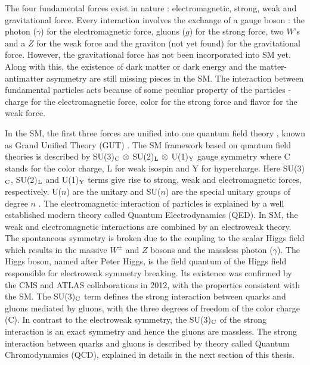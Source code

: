 The four fundamental forces exist in nature : electromagnetic, strong, weak and gravitational force. Every interaction involves the exchange of a gauge boson : the photon ($\gamma$) for the electromagnetic force, gluons ($g$) for the strong force, two $W$'s and a $Z$ for the weak force and the graviton (not yet found) for the gravitational force. However, the gravitational force has not been incorporated into SM yet. Along with this, the existence of dark matter or dark energy and the matter-antimatter asymmetry are still missing pieces in the SM. The interaction between fundamental particles acts because of some peculiar property of the particles - charge for the electromagnetic force, color for the strong force and flavor for the weak force. 

In the SM, the first three forces are unified into one quantum field theory \cite{Peskin:1995ev}, known as Grand Unified Theory (GUT) \cite{Glashow:1979pj,Salam:1980jd,Georgi:1974sy}. The SM framework based on quantum field theories is described by SU(3)$_{\rm C}~\otimes$ SU(2)$_{\rm L}~\otimes$ U(1)$_{\rm Y}$ gauge symmetry where C stands for the color charge, L for weak isospin and Y for hypercharge. Here SU(3)$_{\rm C}$, SU(2)$_{\rm L}$ and U(1)$_{\rm Y}$ terms give rise to strong, weak and electromagnetic forces, respectively. U($n$) are the unitary and SU($n$) are the special unitary groups of degree $n$ . The electromagnetic interaction of particles is explained by a well established modern theory called Quantum Electrodynamics (QED). In SM, the weak and electromagnetic interactions are combined by an electroweak theory. The spontaneous symmetry is broken due to the coupling to the scalar Higgs field which results in the massive $W^{\pm}$ and $Z$ bosons and the massless photon ($\gamma$). The Higgs boson, named after Peter Higgs, is the field quantum of the Higgs field responsible for electroweak symmetry breaking. Its existence was confirmed by the CMS \cite{Chatrchyan:2012xdj} and ATLAS \cite{Aad:2012tfa} collaborations in 2012, with the properties consistent with the SM. The SU(3)$_{\rm C}$ term defines the strong interaction between quarks and gluons mediated by gluons, with the three degrees of freedom of the color charge (C). In contrast to the electroweak symmetry, the SU(3)$_{\rm C}$ of the strong interaction is an exact symmetry and hence the gluons are massless. The strong interaction between quarks and gluons is described by theory called Quantum Chromodynamics (QCD), explained in details in the next section of this thesis.

